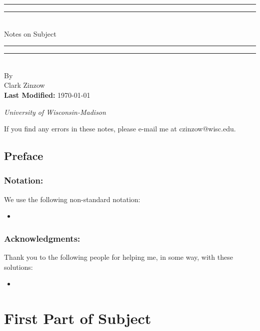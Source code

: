 \documentclass[twoside, titlepage]{amsbook}
\makeatletter
\newcommand{\authorName}{Clark Zinzow}  %
\newcommand{\authorEmail}{czinzow@wisc.edu}  %
\newcommand{\subjectName}{Subject}  %
\newcommand{\institutionName}{University of Wisconsin-Madison}
\newcommand{\lastmodified}{\today}
\theoremstyle{plain} %
\theoremstyle{definition}
\theoremstyle{remark}
\theoremstyle{notation}
\makeatother
\begin{document}
	
\begin{titlepage}
	\centering
	\vspace*{\baselineskip}
	\rule{\textwidth}{1.6pt}\vspace*{-\baselineskip}\vspace*{2pt}
	\rule{\textwidth}{0.4pt}\\[\baselineskip]
	{\Huge Notes on  \subjectName }
	\rule{\textwidth}{0.4pt}\vspace*{-\baselineskip}\vspace*{3pt}
	\rule{\textwidth}{1.6pt}\\[\baselineskip]
	\vspace*{4\baselineskip}
	\huge By \\[\baselineskip]
	{ \authorName}\\[\baselineskip]
	\vspace*{3\baselineskip}
	\huge \textbf{Last Modified:} { \lastmodified } \par
	\vspace*{3\baselineskip}
	\huge {\itshape \institutionName \par}
	\vfill
	{ If you find any errors in these notes, please e-mail me at \authorEmail. \par}
\end{titlepage}

\tableofcontents

\chapter*{Preface}

	\section*{Notation:}
		We use the following non-standard notation:
		\begin{itemize}
			\item 
		\end{itemize}
	
	\section*{Acknowledgments:}
		Thank you to the following people for helping me, in some way, with these solutions:
		\begin{itemize}
			\item 
		\end{itemize}

\part{First Part of Subject}
\end{document}
